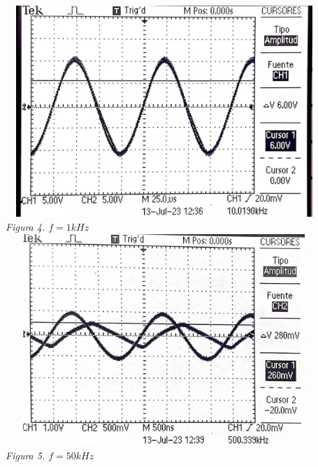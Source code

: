 \documentclass[12pt]{article}
\begin{document}
	\begin{center}
		\includegraphics[width=12cm,height=8cm]{Img/q17-1}\\
		\textit{Figura 4. $f = 1kHz$}\\
		
		\vspace{3cm}
		\includegraphics[width=12cm,height=8cm]{Img/q17-2}\\
		\textit{Figura 5. $f = 50kHz$}\\
	\end{center}
\end{document}
